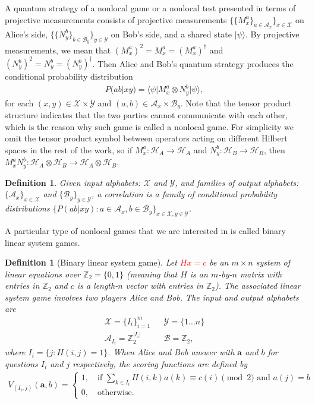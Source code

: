 \documentclass[11pt,letterpaper]{article}
\newcommand{\ket}[1]{|#1\rangle}
\newcommand{\bra}[1]{\langle#1|}
\newcommand{\x}{\otimes}
\newcommand{\Z}{\mathbb{Z}}
\newcommand{\calH}{\mathcal{H}}
\newcommand{\calX}{\mathcal{X}}
\newcommand{\calY}{\mathcal{Y}}
\newcommand{\calA}{\mathcal{A}}
\newcommand{\calB}{\mathcal{B}}
\newcommand{\1}{\mathbb{1}}
\newcommand{\ba}{\pmb{a}}
\newcommand{\pr}[2]{P(#1|#2)}
\newcommand{\hf}[1]{\textcolor{red}{#1}}
\newtheorem{definition}[theorem]{Definition}
\theoremstyle{definition}
\begin{document}
A quantum strategy of a nonlocal game or a nonlocal test presented in terms of projective measurements
consists of projective measurements $\{\{M_x^a\}_{a \in \calA_x} \}_{x \in \calX}$ on Alice's side, 
$\{\{N_y^b\}_{b \in \calB_y} \}_{y \in \calY}$ on Bob's side, and a shared state $\ket{\psi}$. 
By projective measurements, we mean that  
$(M_x^a)^2 = M_x^a = (M_x^a)^\dagger$ and $(N_y^b)^2 = N_y^b = (N_y^b)^\dagger$.
Then Alice and Bob's quantum strategy produces the conditional probability distribution
\begin{align}
	\pr{ab}{xy} = \bra{\psi} M_x^a \x N_y^b \ket{\psi},
\end{align}
for each $(x,y) \in \calX \times \calY$ and $(a,b) \in \calA_x \times \calB_y$.
Note that the tensor product structure indicates that the
two parties cannot communicate with each other, which is the reason why such game is called a nonlocal game.
For simplicity we omit the tensor product symbol between operators acting on different Hilbert spaces in the rest of the work, so if $M_x^a : \calH_A \rightarrow \calH_A$ and $N_y^b: 
\calH_B \rightarrow \calH_B$, then $M_x^a N_y^b: \calH_A\x \calH_B \rightarrow \calH_A \x \calH_B$.
\begin{definition}
	Given input alphabets: $\calX$ and $\calY$, and families of output
	alphabets: $\{\calA_x\}_{x \in \calX}$ and $\{\calB_y\}_{y \in \calY}$, a correlation is a family of conditional probability distributions
	$\{\pr{ab}{xy}: a \in \calA_x, b \in \calB_y\}_{x \in \calX, y \in \calY}$.  
\end{definition}
A particular type of nonlocal games that we are interested in is called binary linear system games.
\begin{definition}[Binary linear system game]
 Let \hf{$Hx = c$} be an $m \times n$ system of linear equations over $\Z_2 = \{0, 1\}$ (meaning that $H$ is an $m$-by-$n$ matrix with entries in $\Z_2$ and 
 $c$ is a length-$n$ vector with entries in $\Z_2$). 
 The associated linear system game involves two
 players Alice and Bob. 
 The input and output alphabets are 
 \begin{align*}
     \calX = \{I_i\}_{i=1}^m && \calY = \{1 \dots n\} \\
     \calA_{I_i} = \Z_2^{|I_i|} && \calB = \Z_2,
 \end{align*}
 where $I_i = \{j : H(i,j) = 1\}$.
 When Alice and Bob answer with $\ba$ and $b$ for questions $I_i$ and
 $j$ respectively,
 the scoring functions are defined by
 \begin{align}
 	V_{(I_i,j)}(\ba, b) =
	\begin{cases}
		1, \quad \text{if } \sum_{k \in I_i} H(i,k) a(k) \equiv c(i) \pmod 2 \text{ and } a(j) = b \\
		0,  \quad \text{otherwise.}
	\end{cases}
\end{align}
\end{definition}
\end{document}
